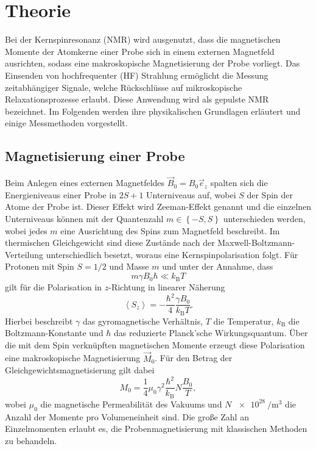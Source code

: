 \section{Theorie}
Bei der Kernspinresonanz (NMR) wird ausgenutzt, dass die magnetischen Momente der Atomkerne einer Probe sich in einem externen Magnetfeld ausrichten, sodass eine makroskopische Magnetisierung der Probe vorliegt. Das Einsenden von hochfrequenter (HF) Strahlung ermöglicht die Messung zeitabhängiger Signale, welche Rückschlüsse auf mikroskopische Relaxationsprozesse erlaubt. Diese Anwendung wird als gepulste NMR bezeichnet. Im Folgenden werden ihre physikalischen Grundlagen erläutert und einige Messmethoden vorgestellt.

\subsection{Magnetisierung einer Probe}
Beim Anlegen eines externen Magnetfeldes $\vec{B}_0 = B_0 \vec{e}_z$ spalten sich die Energieniveaus einer Probe in $2S + 1$ Unterniveaus auf, wobei $S$ der Spin der Atome der Probe ist. Dieser Effekt wird Zeeman-Effekt genannt und die einzelnen Unterniveaus können mit der Quantenzahl $m \in \left\{ -S,S \right\}$ unterschieden werden, wobei jedes $m$ eine Ausrichtung des Spins zum Magnetfeld beschreibt. Im thermischen Gleichgewicht sind diese Zustände nach der Maxwell-Boltzmann-Verteilung unterschiedlich besetzt, woraus eine Kernspinpolarisation folgt. Für Protonen mit Spin $S = 1/2$ und Masse $m$ und unter der Annahme, dass
\begin{equation*}
  m \gamma B_0 \hbar \ll k_\mathrm{B} T
\end{equation*}
gilt für die Polarisation in $z$-Richtung in linearer Näherung
\begin{equation*}
  \left< S_z \right> = - \frac{\hbar^2}{4}\frac{\gamma B_0}{k_\text{B} T}.
\end{equation*}
Hierbei beschreibt $\gamma$ das gyromagnetische Verhältnis, $T$ die Temperatur, $k_\mathrm{B}$ die Boltzmann-Konstante und $\hbar$ das reduzierte Planck'sche Wirkungsquantum. Über die mit dem Spin verknüpften magnetischen Momente erzeugt diese Polarisation eine makroskopische Magnetisierung $\vec{M}_0$. Für den Betrag der Gleichgewichtsmagnetisierung gilt dabei
\begin{equation*}
  M_0 = \frac{1}{4} \mu_0 \gamma^2 \frac{\hbar^2}{k_\mathrm{B}} N \frac{B_0}{T},
\end{equation*}
wobei $\mu_0$ die magnetische Permeabilität des Vakuums und $N ~ \SI{e28}{\per\cubic\metre}$ die Anzahl der Momente pro Volumeneinheit sind. Die große Zahl an Einzelmomenten erlaubt es, die Probenmagnetisierung mit klassischen Methoden zu behandeln.

